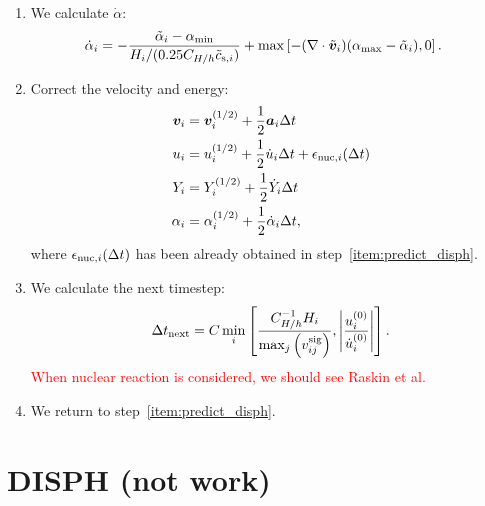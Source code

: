 \documentclass[fleqn,dvipdfmx]{article}
\newcommand{\redtext}[1]{\textcolor{red}{#1}}
\begin{document}
\begin{enumerate}
\item We calculate $\dot{\alpha}$:
  \begin{align}
    \dot{\alpha}_i &= - \frac{\tilde{\alpha}_i - \alpha_{\rm
        min}}{H_i/(0.25C_{H/h}\tilde{c}_{{\rm s},i})} + \max \left[
      -(\nabla \cdot \tilde{\bm{v}}_i)(\alpha_{\rm
        max}-\tilde{\alpha}_i), 0 \right].
  \end{align}

\item Correct the velocity and energy:
  \begin{align}
    \bm{v}_i &= \bm{v}^{(1/2)}_i + \frac{1}{2} \bm{a}_i \Delta t \\
    u_i &= u^{(1/2)}_i + \frac{1}{2} \dot{u}_i \Delta t +
    \epsilon_{{\rm nuc},i}(\Delta t) \\
    Y_i &= Y^{(1/2)}_i + \frac{1}{2} \dot{Y}_i \Delta t \\
    \alpha_i &= \alpha^{(1/2)}_i + \frac{1}{2} \dot{\alpha}_i \Delta
    t,
  \end{align}
  where $\epsilon_{{\rm nuc},i}(\Delta t)$ has been already obtained
  in step~\ref{item:predict_disph}.

\item We calculate the next timestep:
  \begin{align}
    \Delta t_{\rm next} = C \min_i \left[
      \frac{C_{H/h}^{-1}H_i}{\max_j \left( v_{ij}^{\rm sig} \right) },
      \left| \frac{u_i^{(0)}}{\dot{u}_i^{(0)}} \right| \right].
  \end{align}  
  \redtext{When nuclear reaction is considered, we should see Raskin
    et al.}

\item We return to step~\ref{item:predict_disph}.

\end{enumerate}

\section{DISPH (not work)}
\end{document}
